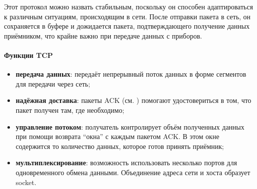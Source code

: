 Этот протокол можно назвать стабильным, поскольку он способен адаптироваться к различным ситуациям, происходящим в сети. После отправки пакета в сеть, он сохраняется в буфере и дожидается пакета, подтверждающего получение данных приёмником, что крайне важно при передаче данных с приборов. 

\paragraph{Функции TCP}
\begin{itemize}
	\item \textbf{передача данных}: передаёт непрерывный поток данных в форме сегментов для передачи через сеть;
	\item \textbf{надёжная доставка}: пакеты ACK (см. ) помогают удостовериться в том, что пакет получен там, где необходимо;
	\item \textbf{управление потоком}: получатель контролирует объём полученных данных при помощи возврата ``окна'' с каждым пакетом ACK. В этом окне содержится то количество данных, которое готов принять приёмник;
	\item \textbf{мультиплексирование}: возможность использовать несколько портов для одновременного обмена данными. Объединение адреса сети и хоста образует \gls{socket}.
\end{itemize}
